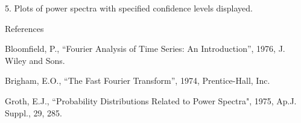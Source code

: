 \item{5.} Plots of power spectra with specified confidence levels displayed.


\@{References}

{\list

Bloomfield, P., ``Fourier Analysis of Time Series: An Introduction'', 1976,
J. Wiley and Sons.

Brigham, E.O., ``The Fast Fourier Transform'', 1974, Prentice-Hall, Inc.

Groth, E.J., ``Probability Distributions Related to Power Spectra", 1975,
Ap.J. Suppl., 29, 285.

}

\vfill\eject



